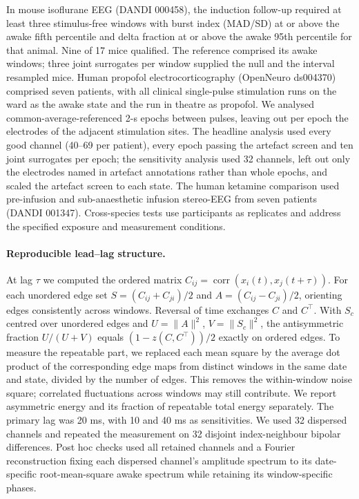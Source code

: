 In mouse isoflurane EEG (DANDI 000458), the induction follow-up required at least three stimulus-free windows with burst index (MAD/SD) at or above the awake fifth percentile and delta fraction at or above the awake 95th percentile for that animal. Nine of 17 mice qualified. The reference comprised its awake windows; three joint surrogates per window supplied the null and the interval resampled mice. Human propofol electrocorticography (OpenNeuro ds004370) comprised seven patients, with all clinical single-pulse stimulation runs on the ward as the awake state and the run in theatre as propofol. We analysed common-average-referenced 2-s epochs between pulses, leaving out per epoch the electrodes of the adjacent stimulation sites. The headline analysis used every good channel (40--69 per patient), every epoch passing the artefact screen and ten joint surrogates per epoch; the sensitivity analysis used 32 channels, left out only the electrodes named in artefact annotations rather than whole epochs, and scaled the artefact screen to each state. The human ketamine comparison used pre-infusion and sub-anaesthetic infusion stereo-EEG from seven patients (DANDI 001347). Cross-species tests use participants as replicates and address the specified exposure and measurement conditions.

\paragraph{Reproducible lead--lag structure.}
At lag $\tau$ we computed the ordered matrix $C_{ij}=\operatorname{corr}(x_i(t),x_j(t+\tau))$. For each unordered edge set $S=(C_{ij}+C_{ji})/2$ and $A=(C_{ij}-C_{ji})/2$, orienting edges consistently across windows. Reversal of time exchanges $C$ and $C^\top$. With $S_c$ centred over unordered edges and $U=\|A\|^2$, $V=\|S_c\|^2$, the antisymmetric fraction $U/(U+V)$ equals $(1-z(C,C^\top))/2$ exactly on ordered edges. To measure the repeatable part, we replaced each mean square by the average dot product of the corresponding edge maps from distinct windows in the same date and state, divided by the number of edges. This removes the within-window noise square; correlated fluctuations across windows may still contribute. We report asymmetric energy and its fraction of repeatable total energy separately. The primary lag was 20 ms, with 10 and 40 ms as sensitivities. We used 32 dispersed channels and repeated the measurement on 32 disjoint index-neighbour bipolar differences. Post hoc checks used all retained channels and a Fourier reconstruction fixing each dispersed channel's amplitude spectrum to its date-specific root-mean-square awake spectrum while retaining its window-specific phases.

